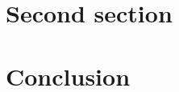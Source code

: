 \documentclass[12pt]{MNE_UOM_thesis}
\begin{document}
    \section{Second section}
    
    \section{Conclusion}


\appendix




\end{document}
